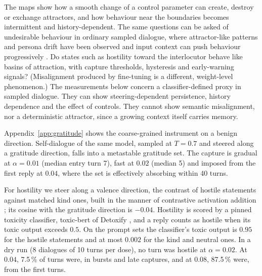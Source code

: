 
The maps show how a smooth change of a control parameter can create, destroy or exchange attractors, and how
behaviour near the boundaries becomes intermittent and history-dependent. The same questions can be asked of
undesirable behaviour in ordinary sampled dialogue, where attractor-like patterns and persona drift have been observed
\cite{ko2026attractor,anthropic2025claude4,lu2026assistant} and input context can push behaviour progressively
\cite{anil2024manyshot}. Do states such as hostility toward the interlocutor behave like basins of attraction, with
capture thresholds, hysteresis and early-warning signals? (Misalignment produced by fine-tuning
\cite{betley2025emergent} is a different, weight-level phenomenon.) The measurements below concern a
classifier-defined proxy in sampled dialogue. They can show steering-dependent persistence, history dependence and the
effect of controls. They cannot show semantic misalignment, nor a deterministic attractor, since a growing context
itself carries memory.

Appendix~\ref{app:gratitude} shows the coarse-grained instrument on a benign direction. Self-dialogue of the same
model, sampled at $T=0.7$ and steered along a gratitude direction, falls into a metastable gratitude set. The capture
is gradual at $\alpha=0.01$ (median entry turn 7), fast at $0.02$ (median 5) and imposed from the first reply at
$0.04$, where the set is effectively absorbing within 40 turns.

For hostility we steer along a valence direction, the contrast of hostile statements against matched kind ones, built
in the manner of contrastive activation addition \cite{rimsky2024steering}; its cosine with the gratitude direction is
$-0.04$. Hostility is scored by a pinned toxicity classifier, toxic-bert of Detoxify \cite{hanu2020detoxify}, and a
reply counts as hostile when its toxic output exceeds $0.5$. On the prompt sets the classifier's toxic output is
$0.95$ for the hostile statements and at most $0.002$ for the kind and neutral ones. In a dry run (8 dialogues of 10
turns per dose), no turn was hostile at $\alpha=0.02$. At $0.04$, 7.5\,\% of turns were, in bursts and late captures,
and at $0.08$, 87.5\,\% were, from the first turns.

